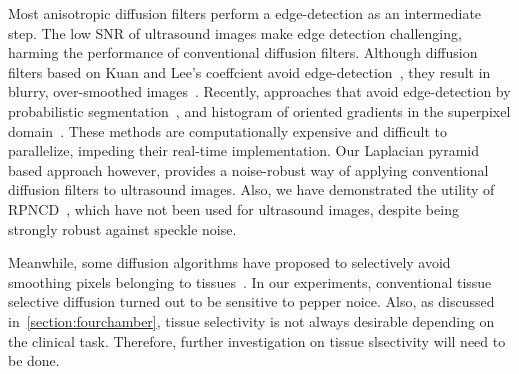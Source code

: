Most anisotropic diffusion filters perform a edge-detection as an intermediate step.
The low SNR of ultrasound images make edge detection challenging, harming the performance of conventional diffusion filters.
Although diffusion filters based on Kuan and Lee's coeffcient avoid edge-detection~\cite{yongjianyu_speckle_2002, aja-fernandez_estimation_2006, krissian_oriented_2007}, they result in blurry, over-smoothed images~\cite{ramos-llorden_anisotropic_2015, mishra_edge_2018}.
Recently, approaches that avoid edge-detection by probabilistic segmentation~\cite{vegas-sanchez-ferrero_probabilisticdriven_2010, ramos-llorden_anisotropic_2015}, and histogram of oriented gradients in the superpixel domain~\cite{mishra_edge_2018}.
These methods are computationally expensive and difficult to parallelize, impeding their real-time implementation.
Our Laplacian pyramid based approach however, provides a noise-robust way of applying conventional diffusion filters to ultrasound images.
Also, we have demonstrated the utility of RPNCD~\cite{gilboa_image_2004}, which have not been used for ultrasound images, despite being strongly robust against speckle noise.

Meanwhile, some diffusion algorithms have proposed to selectively avoid smoothing pixels belonging to tissues~\cite{ramos-llorden_anisotropic_2015, mishra_edge_2018}.
In our experiments, conventional tissue selective diffusion turned out to be sensitive to pepper noice.
Also, as discussed in~\cref{section:fourchamber}, tissue selectivity is not always desirable depending on the clinical task.
Therefore, further investigation on tissue slsectivity will need to be done.




